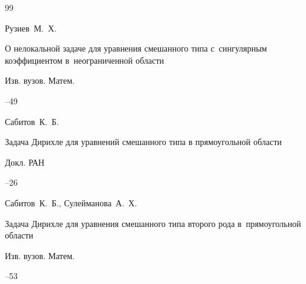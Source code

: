 \begin{thebibliography}{99}






\by Рузиев~М.~Х.

\paper О нелокальной задаче для уравнения смешанного типа с~сингулярным коэффициентом в~неограниченной области

\jour Изв. вузов. Матем.



--49













\by Сабитов~К.~Б.

\paper Задача Дирихле для уравнений смешанного типа в прямоугольной области

\jour Докл. РАН




--26






\by Сабитов~К.~Б., Сулейманова~А.~Х.

\paper Задача Дирихле для уравнения смешанного типа второго рода в~прямоугольной области

\jour Изв. вузов. Матем.



--53



\end{thebibliography}
